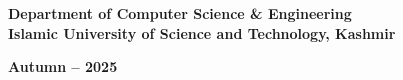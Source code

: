 \documentclass[a4paper,12pt]{report}
\begin{document}
\begin{center}
\vspace{0.8cm}

{\fontsize{14}{16.8}\selectfont\bfseries Department of Computer Science \& Engineering}\\[0.3cm]
{\fontsize{14}{16.8}\selectfont\bfseries Islamic University of Science and Technology, Kashmir}\\[0.2cm]

\vfill

{\fontsize{14}{16.8}\selectfont\bfseries Autumn -- 2025}

\end{center}
\end{document}

